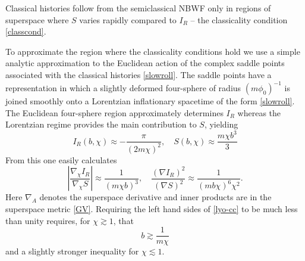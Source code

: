 \documentclass[prd,floats,superscriptaddress,eqsecnum,floatfix,nofootinbib,12pt]{revtex4}
\def\p0{\phi_0}
\def\be{\begin{equation}}
\def\ee{\end{equation}}
\def\zf{}
\def\jf{}
\def\p0{\phi_0}
\begin{document}
{{Classical histories follow from the semiclassical NBWF only in regions of superspace where $S$ varies rapidly compared to $I_R$ -- the classicality condition  \eqref{classcond}.

{\zf {\jf To approximate the region where the classicality conditions hold we use a simple analytic approximation to the  Euclidean action of the complex saddle points associated with the classical histories \eqref{slowroll}.} The saddle points have a representation in which a slightly deformed four-sphere of radius $(m \p0)^{-1}$ is joined smoothly onto a Lorentzian inflationary spacetime of the form \eqref{slowroll}. The Euclidean four-sphere region approximately determines $I_R$ whereas the Lorentzian regime provides the main contribution to $S$, yielding}
\be
\label{lyons-acts}
I_R(b,\chi) \approx - \frac{\pi}{(2m\chi)^2},  \quad  S(b,\chi) \approx \frac{m \chi b^3}{3}
\ee
From this \cite{HHH08b} one easily calculates 
\be
\label{lyo-cc}
\left|\frac{\nabla_\chi I_R}{\nabla_\chi S}\right| \approx \frac {1}{(m\chi b)^3}, \quad
\frac{(\nabla I_R)^2}{(\nabla S)^2} \approx  \frac{1}{(m b \chi)^6 \chi^2 } .
\ee
Here $\nabla_A$ denotes the superspace derivative and inner products are in the superspace metric \eqref{GV}.  Requiring the left hand sides of  \eqref{lyo-cc} to be much less than unity requires, for $\chi\gtrsim 1$, that 
\be
\label{sc-bound}
b \gtrsim \frac{1}{m\chi}
\ee
and a slightly stronger inequality for $\chi \lesssim 1$. 

}}
\end{document}
